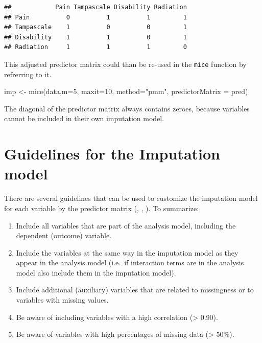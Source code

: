\documentclass[
]{book}
\newenvironment{Shaded}{\begin{snugshade}}{\end{snugshade}}
\newcommand{\AttributeTok}[1]{\textcolor[rgb]{0.77,0.63,0.00}{#1}}
\newcommand{\DecValTok}[1]{\textcolor[rgb]{0.00,0.00,0.81}{#1}}
\newcommand{\FunctionTok}[1]{\textcolor[rgb]{0.00,0.00,0.00}{#1}}
\newcommand{\NormalTok}[1]{#1}
\newcommand{\OtherTok}[1]{\textcolor[rgb]{0.56,0.35,0.01}{#1}}
\newcommand{\SpecialCharTok}[1]{\textcolor[rgb]{0.00,0.00,0.00}{#1}}
\newcommand{\StringTok}[1]{\textcolor[rgb]{0.31,0.60,0.02}{#1}}
\providecommand{\tightlist}{%
  \setlength{\itemsep}{0pt}\setlength{\parskip}{0pt}}
\begin{document}
\begin{Shaded}
\end{Shaded}

\begin{verbatim}
##            Pain Tampascale Disability Radiation
## Pain          0          1          1         1
## Tampascale    1          0          0         1
## Disability    1          1          0         1
## Radiation     1          1          1         0
\end{verbatim}

This adjusted predictor matrix could than be re-used in the \texttt{mice} function by refrerring to it.

\begin{Shaded}
\begin{Highlighting}[]
\NormalTok{imp }\OtherTok{\textless{}{-}} \FunctionTok{mice}\NormalTok{(data,}\AttributeTok{m=}\DecValTok{5}\NormalTok{, }\AttributeTok{maxit=}\DecValTok{10}\NormalTok{, }\AttributeTok{method=}\StringTok{"pmm"}\NormalTok{, }\AttributeTok{predictorMatrix =}\NormalTok{ pred)}
\end{Highlighting}
\end{Shaded}

The diagonal of the predictor matrix always contains zeroes, because variables cannot be included in their own imputation model.

\hypertarget{guidelines-for-the-imputation-model}{%
\section{Guidelines for the Imputation model}\label{guidelines-for-the-imputation-model}}

There are several guidelines that can be used to customize the imputation model for each variable by the predictor matrix (\citet{Collins2001}, \citet{VanBuuren2018}, \citet{Rubin1976}). To summarize:

\begin{enumerate}
\def\labelenumi{\arabic{enumi}.}
\tightlist
\item
  Include all variables that are part of the analysis model, including the dependent (outcome) variable.
\item
  Include the variables at the same way in the imputation model as they appear in the analysis model (i.e.~if interaction terms are in the analysis model also include them in the imputation model).
\item
  Include additional (auxiliary) variables that are related to missingness or to variables with missing values.
\item
  Be aware of including variables with a high correlation (\textgreater{} 0.90).
\item
  Be aware of variables with high percentages of missing data (\textgreater{} 50\%).
\end{enumerate}
\end{document}
